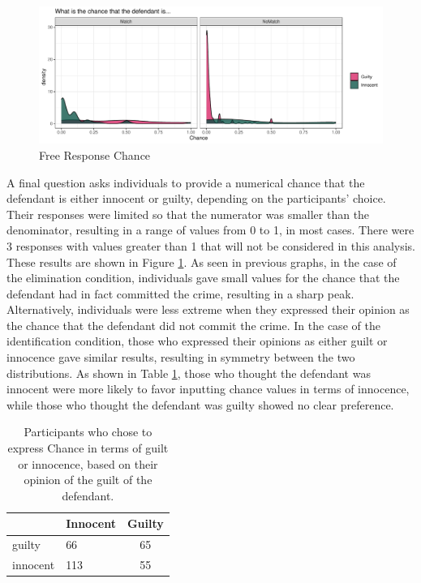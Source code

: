 \documentclass[print]{nuthesis}
\begin{document}
\begin{figure}

{\centering \includegraphics[width=\linewidth]{thesis_files/figure-latex/freelike-1} 

}

\caption{Free Response Chance}\label{fig:freelike}
\end{figure}

A final question asks individuals to provide a numerical chance that the defendant is either innocent or guilty, depending on the participants' choice.
Their responses were limited so that the numerator was smaller than the denominator, resulting in a range of values from 0 to 1, in most cases.
There were 3 responses with values greater than 1 that will not be considered in this analysis.
These results are shown in Figure \ref{fig:freelike}.
As seen in previous graphs, in the case of the elimination condition, individuals gave small values for the chance that the defendant had in fact committed the crime, resulting in a sharp peak.
Alternatively, individuals were less extreme when they expressed their opinion as the chance that the defendant did not commit the crime.
In the case of the identification condition, those who expressed their opinions as either guilt or innocence gave similar results, resulting in symmetry between the two distributions.
As shown in Table \ref{tab:opinionchance}, those who thought the defendant was innocent were more likely to favor inputting chance values in terms of innocence, while those who thought the defendant was guilty showed no clear preference.

\begin{table}

\caption{\label{tab:opinionchance}Participants who chose to express Chance in terms of guilt or innocence, based on their opinion of the guilt of the defendant.}
\centering
\begin{tabular}[t]{l|l|c}
\hline
  & Innocent & Guilty\\
\hline
guilty & 66 & 65\\
\hline
innocent & 113 & 55\\
\hline
\end{tabular}
\end{table}
\end{document}

